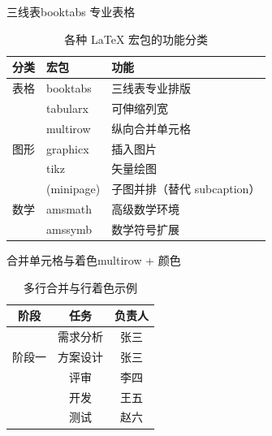 \documentclass[UTF8,11pt,aspectratio=169]{beamer}
\begin{document}
\begin{frame}{三线表}{booktabs 专业表格}
    \begin{table}
        \centering
        \caption{各种 LaTeX 宏包的功能分类}
        \begin{tabular}{lll}
            \toprule
            \textbf{分类}    & \textbf{宏包}      & \textbf{功能}       \\
            \midrule
            表格             & booktabs           & 三线表专业排版      \\
                             & tabularx           & 可伸缩列宽          \\
                             & multirow           & 纵向合并单元格      \\
            \addlinespace   %
            图形             & graphicx           & 插入图片            \\
                             & tikz               & 矢量绘图            \\
                             & (minipage)         & 子图并排（替代 subcaption）\\
            \midrule
            数学             & amsmath            & 高级数学环境        \\
                             & amssymb            & 数学符号扩展        \\
            \bottomrule
        \end{tabular}
    \end{table}
\end{frame}

\begin{frame}{合并单元格与着色}{multirow + 颜色}
    \begin{table}
        \centering
        \caption{多行合并与行着色示例}
        \begin{tabular}{c|c|c}
            \toprule
            \textbf{阶段} & \textbf{任务}     & \textbf{负责人} \\
            \midrule
            \multirow{3}{*}{阶段一}
                & 需求分析  & 张三 \\
                & 方案设计  & 张三 \\
                & 评审      & 李四 \\
            \midrule
            \rowcolor{blue!10}  %
            \multirow{2}{*}{阶段二}
                & 开发      & 王五 \\
            \rowcolor{blue!10}
                & 测试      & 赵六 \\
            \bottomrule
        \end{tabular}
    \end{table}
\end{frame}
\end{document}
